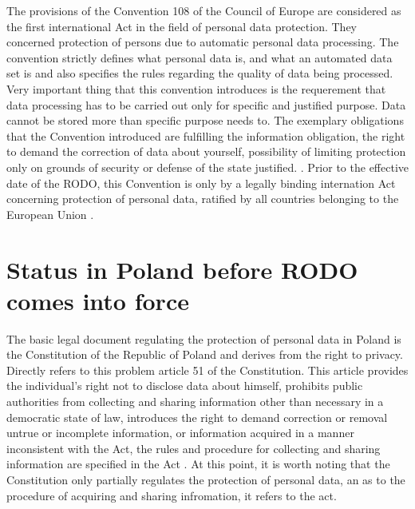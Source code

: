 \documentclass[en, noamssymb]{mgr}
\begin{document}
\indent The provisions of the Convention 108 of the Council of Europe are considered as the first international Act in the field of personal data protection. They concerned protection of persons due to automatic personal data processing. The convention strictly defines what personal data is, and what an automated data set is and also specifies the rules regarding the quality of data being processed. Very important thing that this convention introduces is the requerement that data processing has to be carried out only for specific and justified purpose. Data cannot be stored more than specific purpose needs to. The exemplary obligations that the Convention introduced are fulfilling the information obligation, the right to demand the correction of data about yourself, possibility of limiting protection only on grounds of security or defense of the state justified. \cite{prawo_odo}. Prior to the effective date of the RODO, this Convention is only by a legally binding internation Act concerning protection of personal data, ratified by all countries belonging to the European Union \cite{prawo_odo}.



\section{Status in Poland before RODO comes into force}

The basic legal document regulating the protection of personal data in Poland is the Constitution of the Republic of Poland and derives from the right to privacy. Directly refers to this problem article 51 of the Constitution. This article provides the individual's right not to disclose data about himself, prohibits public authorities from collecting and sharing information other than necessary in a democratic state of law, introduces the right to demand correction or removal untrue or incomplete information, or information acquired in a manner inconsistent with the Act, the rules and procedure for collecting and sharing information are specified in the Act \cite{konstytucja_art51}. At this point, it is worth noting that the Constitution only partially regulates the protection of personal data, an as to the procedure of acquiring and sharing infromation, it refers to the act. 
\end{document}
